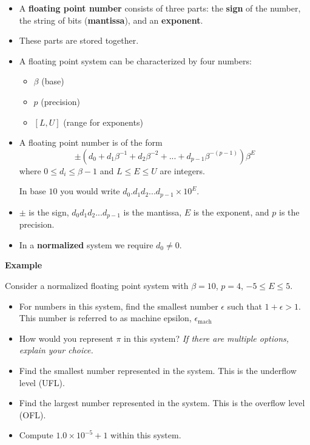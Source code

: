 \documentclass[12pt,letterpaper,noanswers]{exam}
\begin{document}
\begin{tcolorbox}
\begin{itemize}
\itemsep0pt
    \item A \textbf{floating point number} consists of three parts: the \textbf{sign} of the number, the string of bits (\textbf{mantissa}), and an \textbf{exponent}.  \cite{sauer2018numerical}
    \item These parts are stored together.
    \item A floating point system can be characterized by four numbers:
\begin{itemize}
\itemsep0pt
    \item $\beta$ (base)
    \item $p$ (precision)
    \item $[L,U]$ (range for exponents)
\end{itemize}

\item A floating point number is of the form \[ \pm \left(d_0 + d_1\beta^{-1} + d_2 \beta^{-2} + ... + d_{p-1}\beta^{-(p-1)}\right) \beta^E\] where $0\leq d_i\leq \beta-1$ and $L\leq E \leq U$ are integers.

In base $10$ you would write $d_0.d_1d_2...d_{p-1} \times 10^E$.
\item $\pm$ is the sign, $d_0d_1d_2...d_{p-1}$ is the mantissa, $E$ is the exponent, and $p$ is the precision.
\item In a \textbf{normalized} system we require $d_0\neq 0$.
\end{itemize}

\end{tcolorbox}

\noindent\textbf{Example} 

Consider a normalized floating point system with $\beta = 10$, $p = 4$, $-5\leq E \leq 5$.
\begin{itemize}
    \item For numbers in this system, find the smallest number $\epsilon$ such that $1+\epsilon > 1$.  This number is referred to as machine epsilon, $\epsilon_{\text{mach}}$
    \vspace{0.7in}
    
    \item How would you represent $\pi$ in this system?  \emph{If there are multiple options, explain your choice.}
    \vspace{1in}
\end{itemize}


\begin{itemize}
\item Find the smallest number represented in the system.  This is the underflow level (UFL).
\vspace{0.5in}

\item Find the largest number represented in the system.  This is the overflow level (OFL).
\vspace{0.5in}

\item Compute $1.0\times 10^{-5}+ 1$ within this system.
\vspace{0.5in}
\end{itemize}
\end{document}
